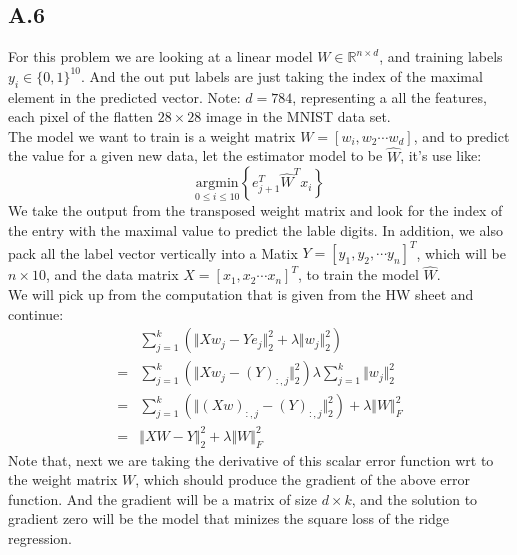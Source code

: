 \documentclass[]{article}
\begin{document}
    \subsection*{A.6}
        For this problem we are looking at a linear model $W\in\mathbb{R}^{n\times d}$, and training labels $y_i\in \{0, 1\}^{10}$. And the out put labels are just taking the index of the maximal element in the predicted vector. Note: $d = 784$, representing a all the features, each pixel of the flatten $28 \times 28$ image in the MNIST data set.
        \\
        The model we want to train is a weight matrix $W = [w_i, w_2 \cdots w_d]$, and to predict the value for a given new data, let the estimator model to be $\hat{W}$, it's use like: 
        $$  
            \underset{0\le i \le 10}{\text{argmin}}\left\lbrace
                e_{j + 1}^T\widehat{W}^Tx_i
            \right\rbrace
        $$
        We take the output from the transposed weight matrix and look for the index of the entry with the maximal value to predict the lable digits. In addition, we also pack all the label vector vertically into a Matix $Y = [y_1, y_2, \cdots y_n]^T$, which will be $n \times 10$, and the data matrix $X = [x_1, x_2 \cdots x_n]^T$, to train the model $\widehat{W}$. 
        \\
        We will pick up from the computation that is given from the HW sheet and continue: 
        \begin{align*}\tag{A.6.1}\label{eqn:A.6.1}
            &\sum_{j = 1}^{k}
            \left(
                    \Vert Xw_j - Ye_j\Vert_2^2 + \lambda \Vert w_j\Vert^2_2
            \right)
            \\
            =& 
            \sum_{j = 1}^{k}\left(
                \Vert Xw_j - (Y)_{:, j} \Vert_2^2
            \right)
            \lambda \sum_{j = 1}^{k}\Vert w_j\Vert_2^2
            \\
            =&
            \sum_{j = 1}^{k}\left(
                \Vert (Xw)_{:, j} - (Y)_{:, j} \Vert_2^2
            \right)
            + 
            \lambda \Vert W\Vert_F^2
            \\
            = &
            \Vert XW  - Y\Vert_2^2 + \lambda\Vert W\Vert_F^2
        \end{align*}
        Note that, next we are taking the derivative of this scalar error function wrt to the weight matrix $W$, which should produce the gradient of the above error function. And the gradient will be a matrix of size $d\times k$, and the solution to gradient zero will be the model that minizes the square loss of the ridge regression. 
\end{document}
